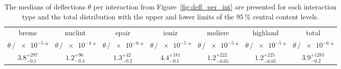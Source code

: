 \begin{table}
    \centering 
    \caption{The medians of deflections $\theta$ per interaction from Figure~\ref{fig:defl_per_int} are presented for each interaction type and the total distribution with the upper and lower limits of the $\SI{95}{\percent}$ 
    central content levels.}
    \begin{tabular}{ccccccc}
        \toprule 
        brems & nuclint & epair & ioniz & moliere & highland & total \\
        $\theta\,/\,\SI{e-5}{\degree}$ & $\theta\,/\,\SI{e-4}{\degree}$ & $\theta\,/\,\SI{e-6}{\degree}$ & $\theta\,/\,\SI{e-5}{\degree}$ & $\theta\,/\,\SI{e-5}{\degree}$ & $\theta\,/\,\SI{e-5}{\degree}$ & $\theta\,/\,\SI{e-6}{\degree}$\\
        \midrule 
        $3.8_{-0.1}^{+297}$ & $1.2_{-0.4}^{+96}$ & $1.3_{-0.2}^{+42}$ & $4.4_{-0.1}^{+181}$& $1.2_{-0.05}^{+222}$ & $1.2_{-0.05}^{+225}$ & $3.9_{-0.2}^{+1285}$\\ 
        \bottomrule
    \end{tabular}
    \label{tab:defl_per_int}
\end{table}
